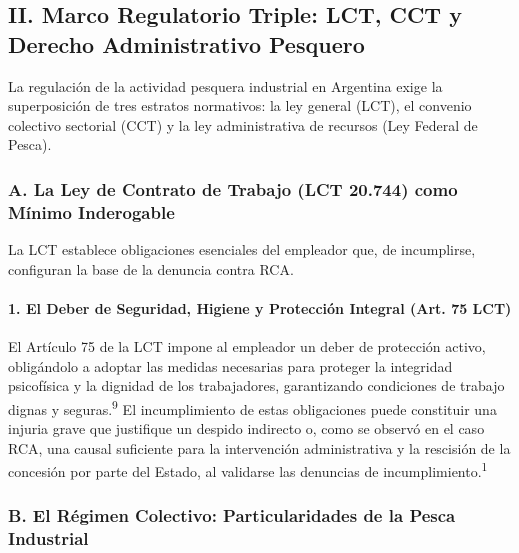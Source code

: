 \documentclass[]{article}
\begin{document}
\hypertarget{ii.-marco-regulatorio-triple-lct-cct-y-derecho-administrativo-pesquero}{%
\subsection{II. Marco Regulatorio Triple: LCT, CCT y Derecho
Administrativo
Pesquero}\label{ii.-marco-regulatorio-triple-lct-cct-y-derecho-administrativo-pesquero}}

La regulación de la actividad pesquera industrial en Argentina exige la
superposición de tres estratos normativos: la ley general (LCT), el
convenio colectivo sectorial (CCT) y la ley administrativa de recursos
(Ley Federal de Pesca).

\hypertarget{a.-la-ley-de-contrato-de-trabajo-lct-20.744-como-muxednimo-inderogable}{%
\subsubsection{A. La Ley de Contrato de Trabajo (LCT 20.744) como Mínimo
Inderogable}\label{a.-la-ley-de-contrato-de-trabajo-lct-20.744-como-muxednimo-inderogable}}

La LCT establece obligaciones esenciales del empleador que, de
incumplirse, configuran la base de la denuncia contra RCA.

\hypertarget{el-deber-de-seguridad-higiene-y-protecciuxf3n-integral-art.-75-lct}{%
\paragraph{1. El Deber de Seguridad, Higiene y Protección Integral (Art.
75
LCT)}\label{el-deber-de-seguridad-higiene-y-protecciuxf3n-integral-art.-75-lct}}

El Artículo 75 de la LCT impone al empleador un deber de protección
activo, obligándolo a adoptar las medidas necesarias para proteger la
integridad psicofísica y la dignidad de los trabajadores, garantizando
condiciones de trabajo dignas y seguras.\textsuperscript{9} El
incumplimiento de estas obligaciones puede constituir una injuria grave
que justifique un despido indirecto o, como se observó en el caso RCA,
una causal suficiente para la intervención administrativa y la rescisión
de la concesión por parte del Estado, al validarse las denuncias de
incumplimiento.\textsuperscript{1}

\hypertarget{b.-el-ruxe9gimen-colectivo-particularidades-de-la-pesca-industrial}{%
\subsubsection{B. El Régimen Colectivo: Particularidades de la Pesca
Industrial}\label{b.-el-ruxe9gimen-colectivo-particularidades-de-la-pesca-industrial}}
\end{document}

